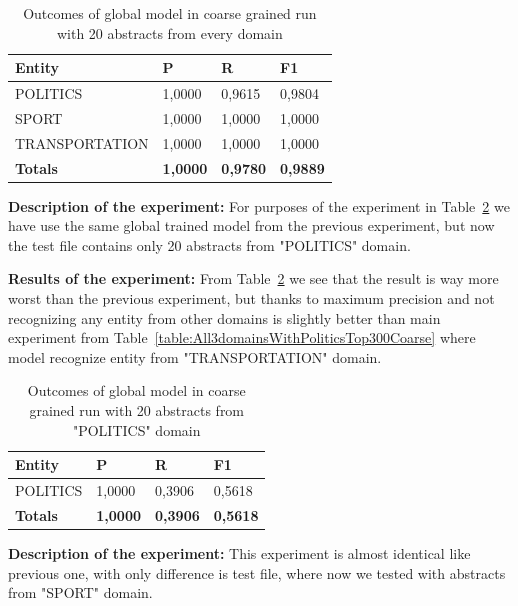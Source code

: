 \documentclass[thesis=M,english]{FITthesis}[2018/05/30]
\begin{document}
	\begin{table}[H]\centering
		\begin{tabular}{|l|l|l|l|}
			\hline {\textbf{Entity}} & {\textbf{P}} & {\textbf{R}} & {\textbf{F1}}\\\hline
				POLITICS & 1,0000 & 0,9615 & 0,9804\\
				SPORT & 1,0000 & 1,0000 & 1,0000\\
				TRANSPORTATION & 1,0000 & 1,0000 & 1,0000\\\hline
				\textbf{Totals} & \textbf{1,0000} & \textbf{0,9780} & \textbf{0,9889}\\\hline
		\end{tabular}
		\caption{Outcomes of global model in coarse grained run with 20 abstracts from every domain \label{table:GlobalDomainWithAllAbstractsTop20Coarse}}
	\end{table}

\textbf{Description of the experiment:} For purposes of the experiment in Table~\ref{table:GlobalDomainWithPoliticsTop20Coarse} we have use the same global trained model from the previous experiment, but now the test file contains only 20 abstracts from "POLITICS" domain. 

\textbf{Results of the experiment:} From Table~\ref{table:GlobalDomainWithPoliticsTop20Coarse} we see that the result is way more worst than the previous experiment, but thanks to maximum precision and not recognizing any entity from other domains is slightly better than main experiment from Table~\ref{table:All3domainsWithPoliticsTop300Coarse} where model recognize entity from "TRANSPORTATION" domain.

	\begin{table}[H]\centering
		\begin{tabular}{|l|l|l|l|}
			\hline {\textbf{Entity}} & {\textbf{P}} & {\textbf{R}} & {\textbf{F1}}\\\hline
				POLITICS & 1,0000 & 0,3906 & 0,5618\\\hline
				\textbf{Totals} & \textbf{1,0000} & \textbf{0,3906} & \textbf{0,5618}\\\hline
		\end{tabular}
		\caption{Outcomes of global model in coarse grained run with 20 abstracts from "POLITICS" domain \label{table:GlobalDomainWithPoliticsTop20Coarse}}
	\end{table}

\textbf{Description of the experiment:} This experiment is almost identical like previous one, with only difference is test file, where now we tested with abstracts from "SPORT" domain.
\end{document}
